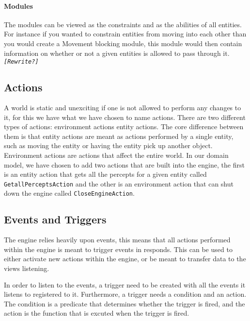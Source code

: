 \paragraph*{Modules}

The modules can be viewed as the constraints and as the abilities
of all entities. For instance if you wanted to constrain entities
from moving into each other than you would create a Movement blocking
module, this module would then contain information on whether or not
a given entities is allowed to pass through it. \texttt{\emph{{[}Rewrite?{]}}}


\subsection{Actions}

A world is static and unexciting if one is not allowed to perform
any changes to it, for this we have what we have chosen to name actions.
There are two different types of actions: environment actions entity
actions. The core difference between them is that entity actions are
meant as actions performed by a single entity, such as moving the
entity or having the entity pick up another object. Environment actions
are actions that affect the entire world. In our domain model, we
have chosen to add two actions that are built into the engine, the
first is an entity action that gets all the percepts for a given entity
called \texttt{GetallPerceptsAction} and the other is an environment
action that can shut down the engine called \texttt{CloseEngineAction}. 


\subsection{Events and Triggers}

The engine relies heavily upon events, this means that all actions
performed within the engine is meant to trigger events in responds.
This can be used to either activate new actions within the engine,
or be meant to transfer data to the views listening. 

In order to listen to the events, a trigger need to be created with
all the events it listens to registered to it. Furthermore, a trigger
needs a condition and an action. The condition is a predicate that
determines whether the trigger is fired, and the action is the function
that is excuted when the trigger is fired.
